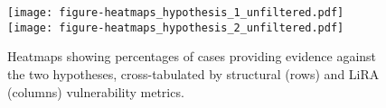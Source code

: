 \begin{figure}[t]
    \centering
    \texttt{[image: figure-heatmaps\_hypothesis\_1\_unfiltered.pdf]}%
    \texttt{[image: figure-heatmaps\_hypothesis\_2\_unfiltered.pdf]}
    \caption{Heatmaps showing percentages of cases providing evidence against the two hypotheses, cross-tabulated by structural (rows) and LiRA (columns) vulnerability metrics.}%
    \label{fig:heatmaps}
\end{figure}
